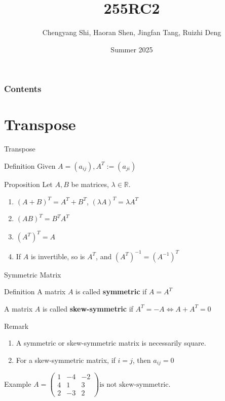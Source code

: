 \documentclass[aspectratio=169]{beamer}
\title{\LARGE 255RC2}
\author{Chengyang Shi, Haoran Shen, Jingfan Tang, Ruizhi Deng}
\date{Summer 2025}
\begin{document}
\maketitle


\begin{frame}
   \frametitle{Contents}
    \tableofcontents     %
\end{frame}






\section{Transpose}
    \begin{frame}{Transpose}
    \begin{block}{Definition}
        $\text{Given } A = (a_{ij}), A^T := (a_{ji})$
    \end{block}
        
        \begin{block}{Proposition}
        Let $A, B$ be matrices, $\lambda \in \mathbb{R}$.
    \begin{enumerate}
        \item $(A+B)^T = A^T + B^T$, $(\lambda A)^T = \lambda A^T $ 
        \item $(AB)^T = B^T A^T$
        \item $(A^T)^T = A$
        \item If $A$ is invertible, so is $A^T$, and $(A^T)^{-1} = (A^{-1})^T$
    \end{enumerate}
    \end{block}
    \end{frame}
    \begin{frame}{Symmetric Matrix}
        \begin{block}{Definition}
            A matrix $A$ is called \textbf{symmetric} if $A = A^T$

            A matrix $A$ is called \textbf{skew-symmetric} if $A^T = -A \iff A + A^T = 0$
        \end{block}
        \begin{block}{Remark}
        \begin{enumerate}
            \item A symmetric or skew-symmetric matrix is necessarily square.
            \item For a skew-symmetric matrix, if $i=j$, then $a_{ij} = 0$
        \end{enumerate}
        \end{block}
        \begin{block}{Example}
            $A = \begin{pmatrix} 1 & -4 & -2 \\ 4 & 1 & 3 \\ 2 & -3 & 2 \end{pmatrix} \text{is not skew-symmetric.}$
        \end{block}
    \end{frame}
\end{document}
